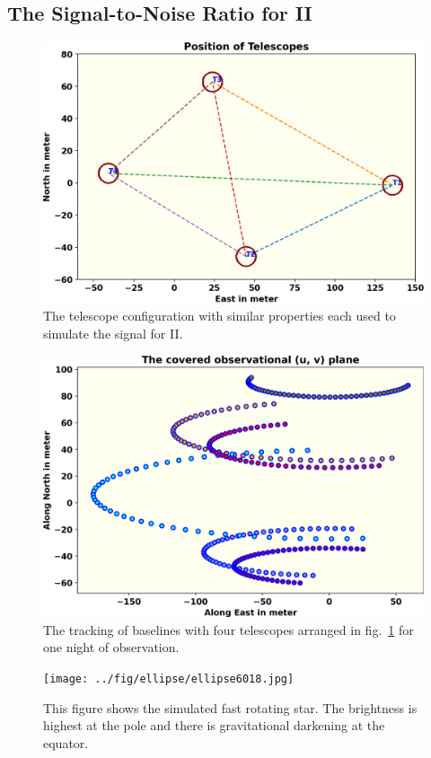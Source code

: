 \documentclass[fleqn,usenatbib,twocolumn]{mnras}
\begin{document}
\subsection{The Signal-to-Noise Ratio for II}
\begin{figure}
	\centering
	\includegraphics[width=\linewidth]{../fig/telescope.png}
	\caption{The telescope configuration with similar properties each used to simulate the signal for II.}
	\label{fig:teles}
\end{figure}
\begin{figure}
	\centering
	\includegraphics[width=\linewidth]{../fig/baseline.png}
	\caption{The tracking of baselines with four telescopes arranged in fig.~\ref{fig:teles} for one night of observation.}
	\label{fig:base}
\end{figure}
\begin{figure}
	\centering
	\texttt{[image: ../fig/ellipse/ellipse6018.jpg]}
	\caption{This figure shows the simulated fast rotating star. The brightness is highest at the pole and there is gravitational darkening at the equator.}
	\label{fig:image}
\end{figure}
\end{document}
